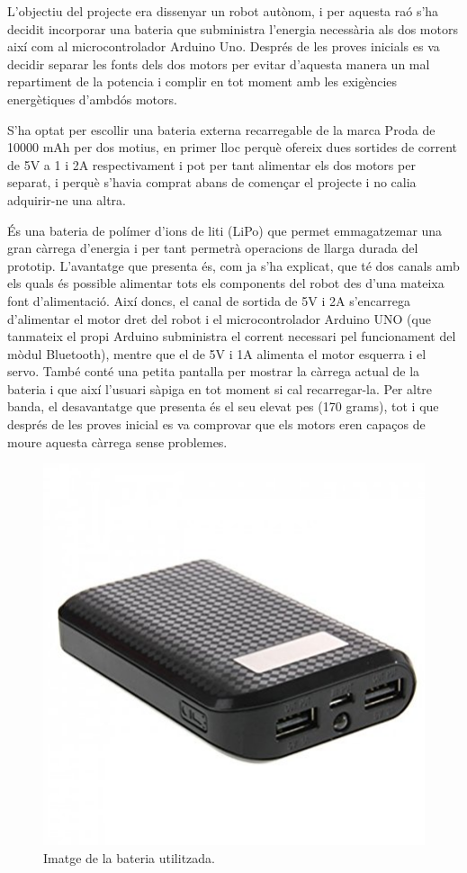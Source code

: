 L’objectiu del projecte era dissenyar un robot autònom, i per aquesta raó s’ha decidit incorporar una bateria que subministra l’energia necessària als dos motors així com al microcontrolador Arduino Uno. Després de les proves inicials es va decidir separar les fonts dels dos motors per evitar d’aquesta manera un mal repartiment de la potencia i complir en tot moment amb les exigències energètiques d’ambdós motors. 

S’ha optat per escollir una bateria externa recarregable de la marca Proda de 10000 mAh per dos motius, en primer lloc perquè ofereix dues sortides de corrent de 5V a 1 i 2A respectivament i pot per tant alimentar els dos motors per separat, i perquè s’havia comprat abans de començar el projecte i no calia adquirir-ne una altra. 

És una bateria de polímer d’ions de liti (LiPo) que permet emmagatzemar una gran càrrega d’energia i per tant permetrà operacions de llarga durada del prototip. L’avantatge que presenta és, com ja s’ha explicat, que té dos canals amb els quals és possible alimentar tots els components del robot des d'una mateixa font d'alimentació. Així doncs, el canal de sortida de 5V i 2A s’encarrega d’alimentar el motor dret del robot i el microcontrolador Arduino UNO (que tanmateix el propi Arduino subministra el corrent necessari pel funcionament del mòdul Bluetooth), mentre que el de 5V i 1A alimenta el motor esquerra i el servo. També conté una petita pantalla per mostrar la càrrega actual de la bateria i que així l’usuari sàpiga en tot moment si cal recarregar-la. Per altre banda, el desavantatge que presenta és el seu elevat pes (170 grams), tot i que després de les proves inicial es va comprovar que els motors eren capaços de moure aquesta càrrega sense problemes. 

\begin{figure}[H]
	\centering
	\includegraphics[scale=0.4]{bateria.png}
	\caption{Imatge de la bateria utilitzada.}
	\label{fig:bateria}
\end{figure}

